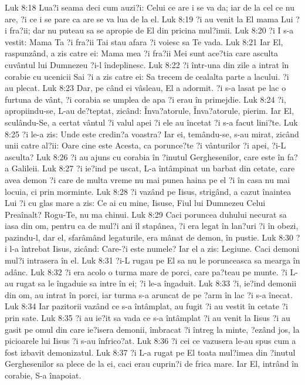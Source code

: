 Luk 8:18  Lua?i seama deci cum auzi?i: Celui ce are i se va da; iar de la cel ce nu are, ?i ce i se pare ca are se va lua de la el.
Luk 8:19  ?i au venit la El mama Lui ?i fra?ii; dar nu puteau sa se apropie de El din pricina mul?imii.
Luk 8:20  ?i I s-a vestit: Mama Ta ?i fra?ii Tai stau afara ?i voiesc sa Te vada.
Luk 8:21  Iar El, raspunzând, a zis catre ei: Mama mea ?i fra?ii Mei sunt ace?tia care asculta cuvântul lui Dumnezeu ?i-l îndeplinesc.
Luk 8:22  ?i într-una din zile a intrat în corabie cu ucenicii Sai ?i a zis catre ei: Sa trecem de cealalta parte a lacului. ?i au plecat.
Luk 8:23  Dar, pe când ei vâsleau, El a adormit. ?i s-a lasat pe lac o furtuna de vânt, ?i corabia se umplea de apa ?i erau în primejdie.
Luk 8:24  ?i, apropiindu-se, L-au de?teptat, zicând: Înva?atorule, Înva?atorule, pierim. Iar El, sculându-Se, a certat vântul ?i valul apei ?i ele au încetat ?i s-a facut lini?te.
Luk 8:25  ?i le-a zis: Unde este credin?a voastra? Iar ei, temându-se, s-au mirat, zicând unii catre al?ii: Oare cine este Acesta, ca porunce?te ?i vânturilor ?i apei, ?i-L asculta?
Luk 8:26  ?i au ajuns cu corabia în ?inutul Gerghesenilor, care este în fa?a Galileii.
Luk 8:27  ?i ie?ind pe uscat, L-a întâmpinat un barbat din cetate, care avea demon ?i care de multa vreme nu mai punea haina pe el ?i în casa nu mai locuia, ci prin morminte.
Luk 8:28  ?i vazând pe Iisus, strigând, a cazut înaintea Lui ?i cu glas mare a zis: Ce ai cu mine, Iisuse, Fiul lui Dumnezeu Celui Preaînalt? Rogu-Te, nu ma chinui.
Luk 8:29  Caci poruncea duhului necurat sa iasa din om, pentru ca de mul?i ani îl stapânea, ?i era legat în lan?uri ?i în obezi, pazindu-l, dar el, sfarâmând legaturile, era mânat de demon, în pustie.
Luk 8:30  ?i l-a întrebat Iisus, zicând: Care-?i este numele? Iar el a zis: Legiune. Caci demoni mul?i intrasera în el.
Luk 8:31  ?i-L rugau pe El sa nu le porunceasca sa mearga în adânc.
Luk 8:32  ?i era acolo o turma mare de porci, care pa?teau pe munte. ?i L-au rugat sa le îngaduie sa intre în ei; ?i le-a îngaduit.
Luk 8:33  ?i, ie?ind demonii din om, au intrat în porci, iar turma s-a aruncat de pe ?arm în lac ?i s-a înecat.
Luk 8:34  Iar pazitorii vazând ce s-a întâmplat, au fugit ?i au vestit în cetate ?i prin sate.
Luk 8:35  ?i au ie?it sa vada ce s-a întâmplat ?i au venit la Iisus ?i au gasit pe omul din care ie?isera demonii, îmbracat ?i întreg la minte, ?ezând jos, la picioarele lui Iisus ?i s-au înfrico?at.
Luk 8:36  ?i cei ce vazusera le-au spus cum a fost izbavit demonizatul.
Luk 8:37  ?i L-a rugat pe El toata mul?imea din ?inutul Gerghesenilor sa plece de la ei, caci erau cuprin?i de frica mare. Iar El, intrând în corabie, S-a înapoiat.
